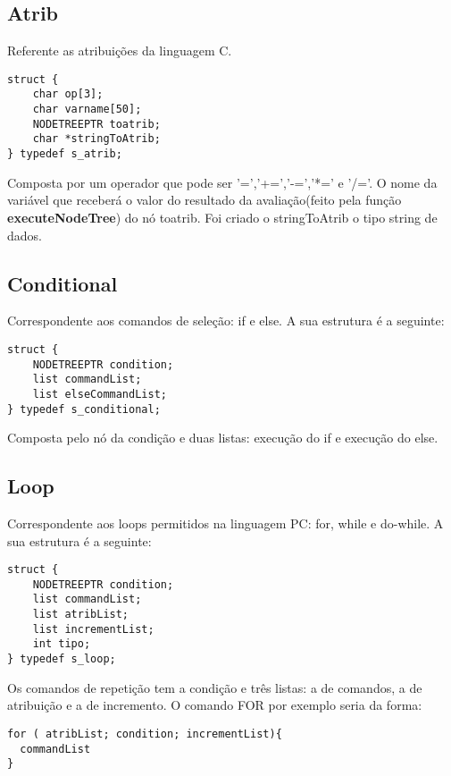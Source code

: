 \documentclass[a4paper,10pt]{article}
\begin{document}
\subsection{Atrib}

Referente as atribuições da linguagem C. 

\begin{lstlisting}
struct {
	char op[3];
	char varname[50];
	NODETREEPTR toatrib;
	char *stringToAtrib;
} typedef s_atrib;
\end{lstlisting}

Composta por um operador que pode ser '=','+=','-=','*=' e '/='. O nome da variável que receberá o valor do resultado da avaliação(feito pela função \textbf{executeNodeTree}) do nó toatrib. Foi criado o
stringToAtrib o tipo string de dados. 

\subsection{Conditional}

Correspondente aos comandos de seleção: if e else. A sua estrutura é a seguinte:

\begin{lstlisting}
struct {
	NODETREEPTR condition;
	list commandList;
	list elseCommandList;
} typedef s_conditional;
\end{lstlisting}

Composta pelo nó da condição e duas listas: execução do if e execução do else. 

\subsection{Loop}

Correspondente aos loops permitidos na linguagem PC: for, while e do-while. A sua estrutura é a seguinte:

\begin{lstlisting}
struct {
	NODETREEPTR condition;
	list commandList;
	list atribList;
	list incrementList;
	int tipo;
} typedef s_loop;
\end{lstlisting}

Os comandos de repetição tem a condição e três listas: a de comandos, a de atribuição e a de incremento. O comando FOR por exemplo seria da forma:

\begin{lstlisting}
for ( atribList; condition; incrementList){
  commandList
}
\end{lstlisting}
\end{document}

